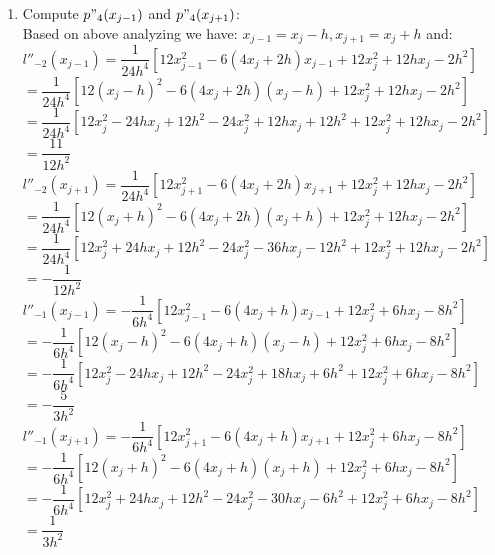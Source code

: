 \documentclass[14pt,a4paper]{article}
\begin{document}
\begin{enumerate}
	\label{1c}
	\item Compute $p"_4(x_{j-1})$ and $p"_4(x_{j+1})$:\\
	Based on above analyzing we have: $x_{j-1} = x_j -h, x_{j+1} = x_j+h$ and: \\
	$l''_{-2}(x_{j-1}) = \dfrac{1}{24h^4} [12x_{j-1}^2 -6(4x_j+2h)x_{j-1} + 12x_j^2 + 12hx_j -2h^2]$\\
	\hspace*{1.6cm} $ = \dfrac{1}{24h^4}[12(x_j-h)^2 -6(4x_j+2h)(x_j-h) +12x_j^2 + 12hx_j -2h^2] $\\
	\hspace*{1.6cm} $ = \dfrac{1}{24h^4}[12x_j^2 -24hx_j +12h^2 -24x_j^2 +12hx_j + 12h^2 + 12x_j^2 + 12hx_j -2h^2] $\\
	\hspace*{1.6cm} $ = \dfrac{11}{12h^2}$\\
	
	$l''_{-2}(x_{j+1}) = \dfrac{1}{24h^4} [12x_{j+1}^2 -6(4x_j+2h)x_{j+1} + 12x_j^2 + 12hx_j -2h^2]$\\
	\hspace*{1.6cm} $ = \dfrac{1}{24h^4}[12(x_j+h)^2 -6(4x_j+2h)(x_j+h) +12x_j^2 + 12hx_j -2h^2] $\\
	\hspace*{1.6cm} $ = \dfrac{1}{24h^4}[12x_j^2 +24hx_j +12h^2 -24x_j^2 -36hx_j - 12h^2 + 12x_j^2 + 12hx_j -2h^2] $\\
	\hspace*{1.6cm} $ = -\dfrac{1}{12h^2}$\\
	
	$l''_{-1}(x_{j-1}) = -\dfrac{1}{6h^4} [12x_{j-1}^2 -6(4x_j+h)x_{j-1} + 12x_j^2 +6hx_j -8h^2]$\\
	\hspace*{1.6cm} $ = -\dfrac{1}{6h^4} [12(x_j-h)^2 -6(4x_j+h)(x_j-h) + 12x_j^2 +6hx_j -8h^2]$\\
	\hspace*{1.6cm} $ = -\dfrac{1}{6h^4} [12x_j^2 -24hx_j +12h^2 -24x_j^2 +18hx_j +6h^2 + 12x_j^2 +6hx_j -8h^2]$\\
	\hspace*{1.6cm} $ = -\dfrac{5}{3h^2}$\\
	
	$l''_{-1}(x_{j+1}) = -\dfrac{1}{6h^4} [12x_{j+1}^2 -6(4x_j+h)x_{j+1} + 12x_j^2 +6hx_j -8h^2]$\\
	\hspace*{1.6cm} $ = -\dfrac{1}{6h^4} [12(x_j+h)^2 -6(4x_j+h)(x_j+h) + 12x_j^2 +6hx_j -8h^2]$\\
	\hspace*{1.6cm} $ = -\dfrac{1}{6h^4} [12x_j^2 +24hx_j +12h^2 -24x_j^2 -30hx_j -6h^2 + 12x_j^2 +6hx_j -8h^2]$\\
	\hspace*{1.6cm} $ = \dfrac{1}{3h^2}$\\
	

\end{enumerate}
\end{document}
